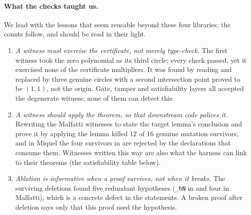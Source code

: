 \documentclass[11pt]{article}
\theoremstyle{definition}
\theoremstyle{remark}
\newcommand{\lean}[1]{\texttt{#1}}
\begin{document}
\paragraph{What the checks taught us.} We lead with the lessons that seem reusable beyond these
four libraries; the counts follow, and should be read in their light.
\begin{enumerate}
\item \emph{A witness must exercise the certificate, not merely type-check.} The first
 witness took the zero polynomial as its third circle; every check passed, yet it
exercised none of the certificate multipliers. It was found by reading and replaced by three
genuine circles with a second intersection point proved to be $(1,1)$, not the origin. Gate, tamper
and satisfiability layers all accepted the degenerate witness; none of them can detect this.
\item \emph{A witness should apply the theorem, so that downstream code polices it.} Rewriting
the Malfatti witnesses to state the target lemma's conclusion and prove it by applying the lemma
killed 12 of 16 genuine mutation survivors, and in Miquel the four survivors in
 are rejected by the declarations that consume them. Witnesses written this way
are also what the harness can link to their theorems (the satisfiability table below).
\item \emph{Ablation is informative when a proof survives, not when it breaks.} The surviving
deletions found five redundant hypotheses (\lean{\_hN} in  and four in
Malfatti), which is a concrete defect in the statements. A broken proof after deletion says only
that this proof used the hypothesis.
\end{enumerate}
\end{document}
